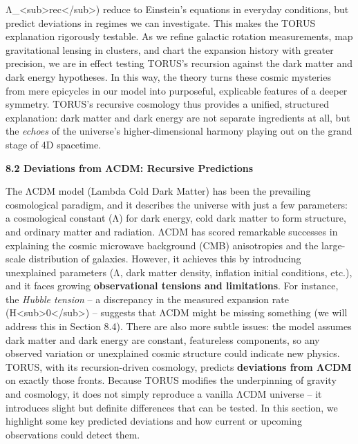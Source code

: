 \documentclass[]{article}
\begin{document}
Λ\_\textless{}sub\textgreater{}rec\textless{}/sub\textgreater{}) reduce
to Einstein's equations in everyday conditions, but predict deviations
in regimes we can investigate​. This makes the TORUS explanation
rigorously testable. As we refine galactic rotation measurements, map
gravitational lensing in clusters, and chart the expansion history with
greater precision, we are in effect testing TORUS's recursion against
the dark matter and dark energy hypotheses. In this way, the theory
turns these cosmic mysteries from mere epicycles in our model into
purposeful, explicable features of a deeper symmetry. TORUS's recursive
cosmology thus provides a unified, structured explanation: dark matter
and dark energy are not separate ingredients at all, but the
\emph{echoes} of the universe's higher-dimensional harmony playing out
on the grand stage of 4D spacetime.

\textbf{8.2 Deviations from ΛCDM: Recursive Predictions}

The ΛCDM model (Lambda Cold Dark Matter) has been the prevailing
cosmological paradigm, and it describes the universe with just a few
parameters: a cosmological constant (Λ) for dark energy, cold dark
matter to form structure, and ordinary matter and radiation. ΛCDM has
scored remarkable successes in explaining the cosmic microwave
background (CMB) anisotropies and the large-scale distribution of
galaxies. However, it achieves this by introducing unexplained
parameters (Λ, dark matter density, inflation initial conditions, etc.),
and it faces growing \textbf{observational tensions and limitations}.
For instance, the \emph{Hubble tension} -- a discrepancy in the measured
expansion rate
(H\textless{}sub\textgreater{}0\textless{}/sub\textgreater{}) --
suggests that ΛCDM might be missing something (we will address this in
Section 8.4). There are also more subtle issues: the model assumes dark
matter and dark energy are constant, featureless components, so any
observed variation or unexplained cosmic structure could indicate new
physics. TORUS, with its recursion-driven cosmology, predicts
\textbf{deviations from ΛCDM} on exactly those fronts. Because TORUS
modifies the underpinning of gravity and cosmology, it does not simply
reproduce a vanilla ΛCDM universe -- it introduces slight but definite
differences that can be tested. In this section, we highlight some key
predicted deviations and how current or upcoming observations could
detect them.
\end{document}
